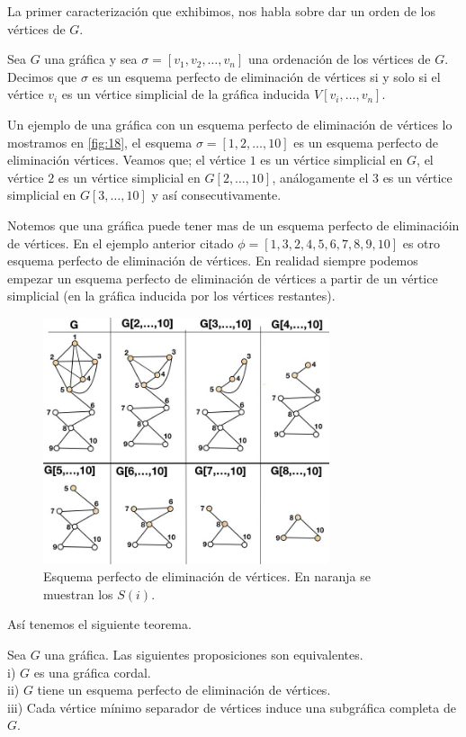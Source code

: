 La primer caracterización que exhibimos, nos habla sobre dar un orden de los vértices de $G$.

Sea $G$ una gráfica y sea $\sigma= [v_1,v_2, \dots, v_n]$ una ordenación de los vértices de $G$. Decimos que $\sigma$ es un esquema perfecto de eliminación de vértices si y solo si el vértice $v_i$ es un vértice simplicial de la gráfica inducida $V[v_{i}, \dots , v_n]$.

Un ejemplo de una gráfica con un esquema perfecto de eliminación de vértices lo mostramos en \cref{fig:18}, el esquema $\sigma=[1,2,\dots, 10]$ es un esquema perfecto de eliminación vértices. Veamos que; el vértice $1$ es un vértice simplicial en $G$, el vértice $2$ es un vértice simplicial en $G[2, \dots, 10]$, análogamente el $3$ es un vértice simplicial en $G[3, \dots, 10]$ y así consecutivamente. 

Notemos que una gráfica puede tener mas de un esquema perfecto de eliminacióin de vértices. En el ejemplo anterior citado $\phi = [1,3,2,4,5,6,7,8,9,10]$ es otro esquema perfecto de eliminación de vértices. En realidad siempre podemos empezar un esquema perfecto de eliminación de vértices a partir de un vértice simplicial (en la gráfica inducida por los vértices restantes).

\begin{figure}[H]
  \centering
  \includegraphics[width=0.75\textwidth]{recursos/capturas/19.jpg}
  \caption{Esquema perfecto de eliminación de vértices. En naranja se muestran los $S(i)$.}
  \label{fig:16}
\end{figure}

Así tenemos el siguiente teorema. 

\begin{teorema}
\label{teo:102}
    Sea $G$ una gráfica. Las siguientes proposiciones son equivalentes.\\
    i) $G$ es una gráfica cordal.\\
    ii) $G$ tiene un esquema perfecto de eliminación de vértices.\\
    iii) Cada vértice mínimo separador de vértices induce una subgráfica completa de $G$.
\end{teorema}

